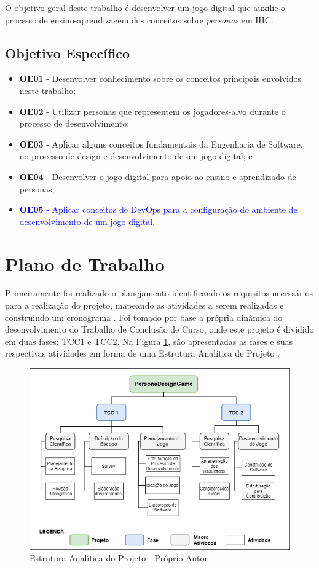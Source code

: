 O objetivo geral deste trabalho é desenvolver um jogo digital que auxilie o processo de ensino-aprendizagem dos conceitos sobre \textit{personas} em IHC.

\subsection{Objetivo Específico}
\begin{itemize}
    \item \textbf{OE01} - Desenvolver conhecimento sobre os conceitos principais envolvidos neste trabalho;
    \item \textbf{OE02} - Utilizar personas que representem os jogadores-alvo durante o processo de desenvolvimento;
    \item \textbf{OE03} - Aplicar alguns conceitos fundamentais da Engenharia de Software, no processo de design e desenvolvimento de um jogo digital; e    
    \item \textbf{OE04} - Desenvolver o jogo digital para apoio ao ensino e aprendizado de personas;
    \item \textcolor{blue}{\textbf{OE05} - Aplicar conceitos de DevOps para a configuração do ambiente de desenvolvimento de um jogo digital.}
\end{itemize}

\section{Plano de Trabalho}

Primeiramente foi realizado o planejamento identificando os requisitos necessários para a realização do projeto, mapeando as atividades a serem realizadas e construindo um cronograma \cite[p. 74]{Pressman_2000}. Foi tomado por base a própria dinâmica do desenvolvimento do Trabalho de Conclusão de Curso, onde este projeto é dividido em duas fases: TCC1 e TCC2. Na Figura \ref{Fig:eap.png}, são apresentadas as fases e suas respectivas atividades em forma de uma Estrutura Analítica de Projeto \cite[p. 112]{pmbok}. %

\begin{figure}[htbp]
	\centering
		\includegraphics[keepaspectratio=true,scale=0.60]{figuras/eap.png}
	\caption{Estrutura Analítica do Projeto - Próprio Autor}
	\label{Fig:eap.png}
\end{figure}

